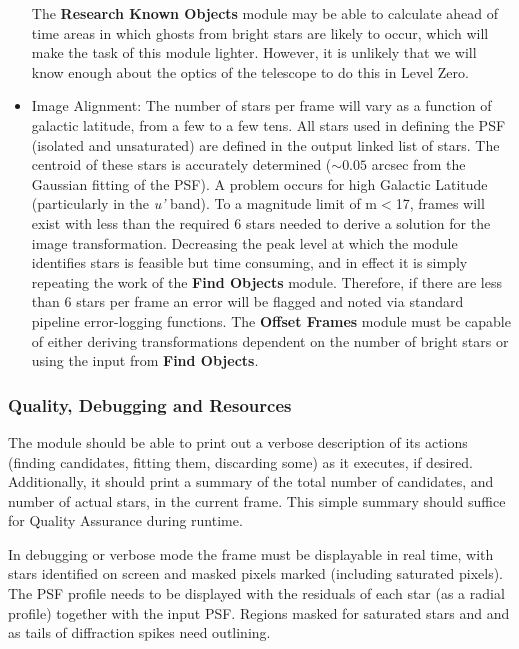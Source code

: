 \begin{itemize}
The {\bf Research Known Objects} module may be able to calculate 
ahead of time areas in which ghosts from bright stars are likely 
to occur, which will make the task of this module lighter.  
However,
it is unlikely that we will know enough about the optics of the 
telescope to do this in Level Zero.


  \item Image Alignment:
The number of stars per frame will vary as a function of galactic latitude,
from a few to a few tens. All stars used in defining the PSF
(isolated and unsaturated) are 
defined in the output linked list of
stars. The
centroid of these stars is accurately determined ($\sim 0.05$ arcsec from the
Gaussian fitting of the PSF). A problem occurs for high Galactic Latitude
(particularly in the {\it u'} band). 
To a magnitude limit of m$<$17, frames will exist
with less than the required 6 stars needed to derive a solution for the image
transformation. Decreasing the peak level at which the \fbs module
identifies stars is feasible but time consuming,
and in effect it is simply repeating the work of the 
{\bf Find Objects} module. 
Therefore, if there are less than 6 stars per frame an
error will be flagged 
and noted via standard pipeline error-logging functions.
The {\bf Offset Frames} module must be capable of either deriving
transformations dependent on the number of bright stars or using the
input from {\bf Find Objects}.

\end{itemize}

\subsubsection{Quality, Debugging and Resources}

The module should be able to print out a verbose description of
its actions (finding candidates, fitting them, discarding some)
as it executes, if desired.
Additionally, it should print a summary of the total number of candidates,
and number of actual stars, in the current frame.
This simple summary should suffice for Quality Assurance during runtime.

In debugging or verbose mode the frame must be displayable in 
real time, with
stars identified on screen and masked pixels marked (including saturated
pixels). The PSF profile needs to be displayed with the residuals of each star
(as a radial profile) together with the input PSF. Regions masked 
for saturated stars and and as tails of diffraction spikes need outlining.

